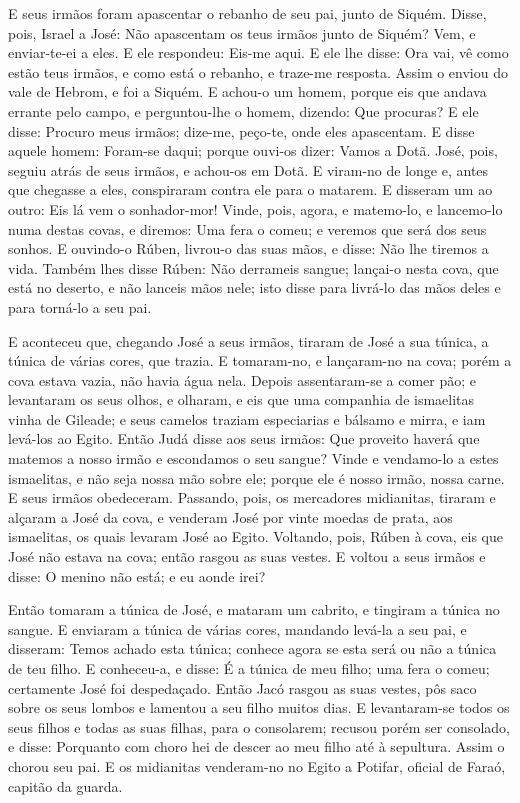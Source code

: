 E seus irmãos foram apascentar o rebanho de seu pai, junto de
Siquém. Disse, pois, Israel a José: Não apascentam os teus
irmãos junto de Siquém? Vem, e enviar-te-ei a eles. E ele respondeu:
Eis-me aqui. E ele lhe disse: Ora vai, vê como estão teus
irmãos, e como está o rebanho, e traze-me resposta. Assim o enviou
do vale de Hebrom, e foi a Siquém. E achou-o um homem, porque
eis que andava errante pelo campo, e perguntou-lhe o homem, dizendo:
Que procuras? E ele disse: Procuro meus irmãos; dize-me,
peço-te, onde eles apascentam. E disse aquele homem: Foram-se
daqui; porque ouvi-os dizer: Vamos a Dotã. José, pois, seguiu atrás
de seus irmãos, e achou-os em Dotã. E viram-no de longe e,
antes que chegasse a eles, conspiraram contra ele para o matarem.
E disseram um ao outro: Eis lá vem o sonhador-mor!
Vinde, pois, agora, e matemo-lo, e lancemo-lo numa destas
covas, e diremos: Uma fera o comeu; e veremos que será dos seus
sonhos. E ouvindo-o Rúben, livrou-o das suas mãos, e disse:
Não lhe tiremos a vida. Também lhes disse Rúben: Não
derrameis sangue; lançai-o nesta cova, que está no deserto, e não
lanceis mãos nele; isto disse para livrá-lo das mãos deles e para
torná-lo a seu pai.

E aconteceu que, chegando José a seus irmãos, tiraram de José a
sua túnica, a túnica de várias cores, que trazia. E
tomaram-no, e lançaram-no na cova; porém a cova estava vazia, não
havia água nela. Depois assentaram-se a comer pão; e
levantaram os seus olhos, e olharam, e eis que uma companhia de
ismaelitas vinha de Gileade; e seus camelos traziam especiarias e
bálsamo e mirra, e iam levá-los ao Egito. Então Judá disse
aos seus irmãos: Que proveito haverá que matemos a nosso irmão e
escondamos o seu sangue? Vinde e vendamo-lo a estes
ismaelitas, e não seja nossa mão sobre ele; porque ele é nosso
irmão, nossa carne. E seus irmãos obedeceram. Passando, pois,
os mercadores midianitas, tiraram e alçaram a José da cova, e
venderam José por vinte moedas de prata, aos ismaelitas, os quais
levaram José ao Egito. Voltando, pois, Rúben à cova, eis que
José não estava na cova; então rasgou as suas vestes. E
voltou a seus irmãos e disse: O menino não está; e eu aonde irei?

Então tomaram a túnica de José, e mataram um cabrito, e tingiram
a túnica no sangue. E enviaram a túnica de várias cores,
mandando levá-la a seu pai, e disseram: Temos achado esta túnica;
conhece agora se esta será ou não a túnica de teu filho. E
conheceu-a, e disse: É a túnica de meu filho; uma fera o comeu;
certamente José foi despedaçado. Então Jacó rasgou as suas
vestes, pôs saco sobre os seus lombos e lamentou a seu filho muitos
dias. E levantaram-se todos os seus filhos e todas as suas
filhas, para o consolarem; recusou porém ser consolado, e disse:
Porquanto com choro hei de descer ao meu filho até à sepultura.
Assim o chorou seu pai. E os midianitas venderam-no no Egito
a Potifar, oficial de Faraó, capitão da guarda.

